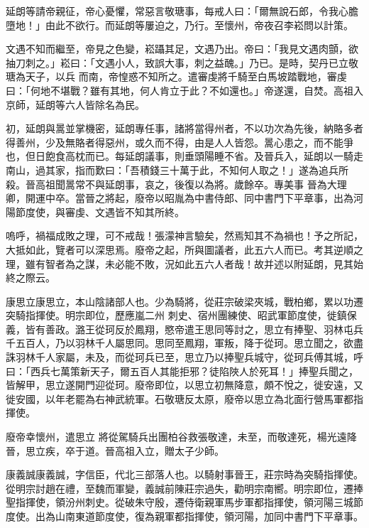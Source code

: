 \begin{pinyinscope}
 延朗等請帝親征，帝心憂懼，常惡言敬瑭事，每戒人曰：「爾無說石郎，令我心膽墮地！」由此不欲行。而延朗等屢迫之，乃行。至懷州，帝夜召李崧問以計策。



 文遇不知而繼至，帝見之色變，崧躡其足，文遇乃出。帝曰：「我見文遇肉顫，欲抽刀刺之。」崧曰：「文遇小人，致誤大事，刺之益醜。」乃已。是時，契丹已立敬瑭為天子，以兵
 而南，帝惶惑不知所之。遣審虔將千騎至白馬坡踏戰地，審虔曰：「何地不堪戰？雖有其地，何人肯立于此？不如還也。」帝遂還，自焚。高祖入京師，延朗等六人皆除名為民。



 初，延朗與暠並掌機密，延朗專任事，諸將當得州者，不以功次為先後，納賂多者得善州，少及無賂者得惡州，或久而不得，由是人人皆怨。暠心患之，而不能爭也，但日飽食高枕而已。每延朗議事，則垂頭陽睡不省。及晉兵入，延朗以一騎走南山，過其家，指而歎曰：「吾積錢三十萬于此，不知何人取之！」遂為追兵所殺。晉高祖聞暠常不與延朗事，哀之，後復以為將。歲餘卒。專美事
 晉為大理卿，開運中卒。當晉之將起，廢帝以昭胤為中書侍郎、同中書門下平章事，出為河陽節度使，與審虔、文遇皆不知其所終。



 嗚呼，禍福成敗之理，可不戒哉！張濛神言驗矣，然焉知其不為禍也！予之所記，大抵如此，覽者可以深思焉。廢帝之起，所與圖議者，此五六人而已。考其逆順之理，雖有智者為之謀，未必能不敗，況如此五六人者哉！故并述以附延朗，見其始終之際云。



 康思立康思立，本山陰諸部人也。少為騎將，從莊宗破梁夾城，戰柏鄉，累以功遷突騎指揮使。明宗即位，歷應嵐二州
 刺史、宿州團練使、昭武軍節度使，徙鎮保義，皆有善政。潞王從珂反於鳳翔，愍帝遣王思同等討之，思立有捧聖、羽林屯兵千五百人，乃以羽林千人屬思同。思同至鳳翔，軍叛，降于從珂。思立聞之，欲盡誅羽林千人家屬，未及，而從珂兵已至，思立乃以捧聖兵城守，從珂兵傅其城，呼曰：「西兵七萬策新天子，爾五百人其能拒邪？徒陷陜人於死耳！」捧聖兵聞之，皆解甲，思立遂開門迎從珂。廢帝即位，以思立初無降意，頗不悅之，徙安遠，又徙安國，以年老罷為右神武統軍。石敬瑭反太原，廢帝以思立為北面行營馬軍都指揮使。



 廢帝幸懷州，遣思立
 將從駕騎兵出團柏谷救張敬達，未至，而敬達死，楊光遠降晉，思立疾，卒于道。晉高祖入立，贈太子少師。



 康義誠康義誠，字信臣，代北三部落人也。以騎射事晉王，莊宗時為突騎指揮使。從明宗討趙在禮，至魏而軍變，義誠前陳莊宗過失，勸明宗南嚮。明宗即位，遷捧聖指揮使，領汾州刺史。從破朱守殷，遷侍衛親軍馬步軍都指揮使，領河陽三城節度使。出為山南東道節度使，復為親軍都指揮使，領河陽，加同中書門下平章事。




\end{pinyinscope}
